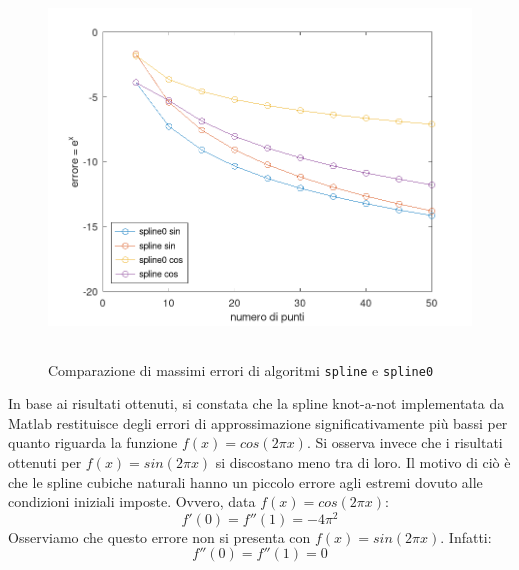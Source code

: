 \begin{figure}[!ht]
    \centering
    \includegraphics[width=16cm,height=10cm,keepaspectratio]{capitolo4/es22_figure.png}
    \caption{Comparazione di massimi errori di algoritmi \lstinline{spline} e \lstinline{spline0}}
    \label{fig:es22}
\end{figure}
\FloatBarrier
In base ai risultati ottenuti, si constata che la spline knot-a-not implementata da
Matlab restituisce degli errori di approssimazione significativamente più bassi
per quanto riguarda la funzione $f(x) = cos(2 \pi x)$. Si osserva invece che i risultati
ottenuti per $f(x) = sin(2 \pi x)$ si discostano meno tra di loro. Il motivo di ciò è
che le spline cubiche naturali hanno un piccolo errore agli estremi dovuto alle
condizioni iniziali imposte. Ovvero, data $f(x) = cos(2 \pi x)$:
\[
    f'(0) = f''(1) = -4 \pi ^2
\]
Osserviamo che questo errore non si presenta con $f(x) = sin(2 \pi x)$. Infatti:
\[
    f''(0) = f''(1) = 0
\]
